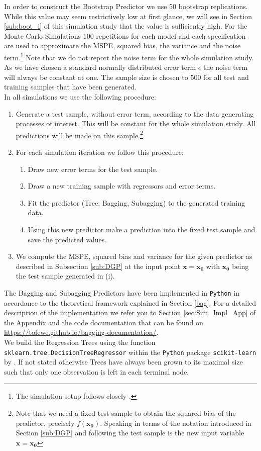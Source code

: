 In order to construct the Bootstrap Predictor we use 50 bootstrap replications. While this value may seem restrictively low at first glance, we will see in Section \ref{sub:boot_i} of this simulation study that the value is sufficiently high.
For the Monte Carlo Simulations 100 repetitions for each model and each specification are used to approximate the MSPE, squared bias, the variance and the noise term.\footnote{The simulation setup follows closely \cite{Buhlmann2002}.} Note that we do not report the noise term for the whole simulation study. As we have chosen a standard normally distributed error term $\epsilon$ the noise term will always be constant at one. The sample size is chosen to 500 for all test and training samples that have been generated.\\
In all simulations we use the following procedure:
\begin{enumerate}
  \item Generate a test sample, without error term, according to the data generating processes of interest. This will be constant for the whole simulation study. All predictions will be made on this sample.\footnote{Note that we need a fixed test sample to obtain the squared bias of the predictor, precisely $f(\mathbf{x_0})$. Speaking in terms of the notation introduced in Section \ref{sub:DGP} and following \cite{EoSL} the test sample is the new input variable $\mathbf{x}=\mathbf{x_0}$}
  \item For each simulation iteration we follow this procedure:
  \begin{enumerate}
    \item Draw new error terms for the test sample.
    \item Draw a new training sample with regressors and error terms.
    \item Fit the predictor (Tree, Bagging, Subagging) to the generated training data.
    \item Using this new predictor make a prediction into the fixed test sample and save the predicted values.
  \end{enumerate}

  \item We compute the MSPE, squared bias and variance for the given predictor as described in Subsection \ref{sub:DGP} at the input point $\mathbf{x}=\mathbf{x_{0}}$ with $\mathbf{x_{0}}$ being the test sample generated in (i).
\end{enumerate}
The Bagging and Subagging Predictors have been implemented in \texttt{Python} in accordance to the theoretical framework explained in Section \ref{bag}. For a detailed description of the implementation we refer you to Section \ref{sec:Sim_Impl_App} of the Appendix and the code documentation that can be found on \url{https://tofewe.github.io/bagging-documentation/}.\\ We build the Regression Trees using the function \texttt{sklearn.tree.DecisionTreeRegressor} within the \texttt{Python} package \texttt{scikit-learn} by \cite{scikit-learn2011}. If not stated otherwise Trees have always been grown to its maximal size such that only one observation is left in each terminal node.



